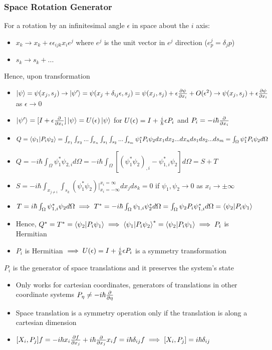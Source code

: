 \documentclass[8pt,t,mathserif,aspectratio=169]{beamer}
\begin{document}
\begin{frame}
  \frametitle{Space Rotation Generator}
  \vspace{1mm}
  For a rotation by an infinitesimal angle $\epsilon$ in space about the $i$ axis: 
  \begin{itemize}
    \item $x_k \to x_k + \epsilon \epsilon_{ijk} x_i e^j$ where $e^j$ is the unit vector in $e^j$ direction ($e^j_p = \delta_jp$)
    \item $s_k \to s_k + ... $
  \end{itemize}
  Hence, upon transformation
  \begin{itemize}
    \item $\ket{\psi} = \psi(x_j,s_j) \to \ket{\psi'} = \psi(x_j + \delta_{ij} \epsilon,s_j) = \psi(x_j,s_j) + \epsilon {\partial \psi \over \partial x_i} + O(\epsilon^2) \to \psi(x_j,s_j) + \epsilon {\partial \psi \over \partial x_i}$ as $\epsilon \to 0$
    \item $\ket{\psi'} = [I + \epsilon {\partial \over \partial x_i}] \ket{\psi} = U(\epsilon) \ket{\psi}$ for $U(\epsilon) = I + {i \over \hbar} \epsilon P_i$ and $P_i = -i \hbar {\partial \over \partial x_i}$ 
    \item $Q = \braket{\psi_1}{P_i \psi_2} = \int_{x_1} \int_{x_2} ... \int_{x_n} \int_{s_1} \int_{s_2} ... \int_{s_m} \psi^*_1 P_i \psi_2 dx_1 dx_2 ... dx_n ds_1 ds_2 ... ds_m = \int_{\Omega} \psi^*_1 P_i \psi_2 d\Omega$
    \item $Q = -i \hbar \int_{\Omega} \psi^*_1 \psi_{2,i} d\Omega = -i \hbar \int_{\Omega} [(\psi^*_1 \psi_2)_{,i} - \psi^*_{1,i} \psi_2] d\Omega = S + T$ 
    \item $S = -i \hbar \int_{x_{j \neq i}} \int_{s_k} (\psi^*_1 \psi_2)|^{x_i = \infty}_{x_i = -\infty} dx_j ds_k = 0$ if $\psi_1,\psi_2 \to 0$ as $x_i \to \pm \infty$
    \item $T = i \hbar \int_{\Omega} \psi^*_{1,i} \psi_2 d\Omega \implies T^* = -i \hbar \int_{\Omega} \psi_{1,i} \psi^*_2 d\Omega = \int_{\Omega} \psi_2 P_i \psi^*_{1,i} d\Omega = \braket{\psi_2}{P_i \psi_1}$
    \item Hence, $Q^* = T^* = \braket{\psi_2}{P_i \psi_1} \implies \braket{\psi_1}{P_i \psi_2}^* = \braket{\psi_2}{P_i \psi_1} \implies P_i$ is Hermitian
    \item $P_i$ is Hermitian $\implies U(\epsilon) = I + {i \over \hbar} \epsilon P_i$ is a symmetry transformation
  \end{itemize}
  $P_i$ is the generator of space translations and it preserves the system's state
  \begin{itemize}
    \item Only works for cartesian coordinates, generators of translations in other coordinate systems $P_\eta \neq -i \hbar {\partial \over \partial \eta}$
    \item Space translation is a symmetry operation only if the translation is along a cartesian dimension
    \item $[X_i,P_j]f = -i \hbar x_i {\partial f \over \partial x_j} + i \hbar {\partial \over \partial x_j} x_i f = i \hbar \delta_{ij} f \implies [X_i,P_j] = i \hbar \delta_{ij}$
  \end{itemize}
 

\end{frame}
\end{document}
